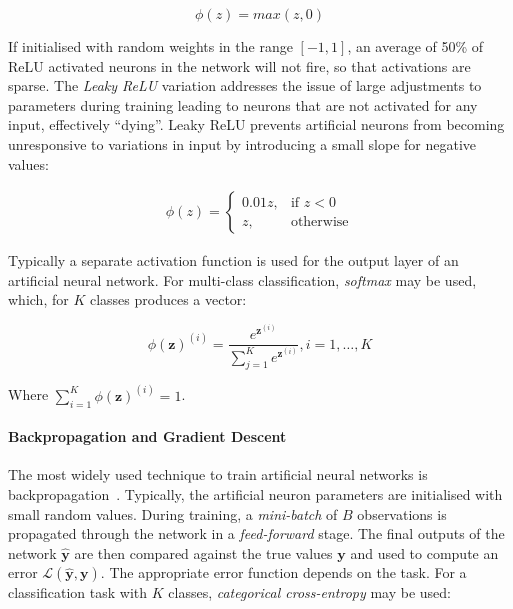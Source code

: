 \begin{equation}
  \phi(z) = max(z, 0)
\end{equation}

If initialised with random weights in the range $[-1,1]$, an average of 50\% of ReLU activated neurons in the network will not fire, so that activations are sparse.
The \emph{Leaky ReLU} variation addresses the issue of large adjustments to parameters during training leading to neurons that are not activated for any input, effectively ``dying''. Leaky ReLU prevents artificial neurons from becoming unresponsive to variations in input by introducing a small slope for negative values:

\begin{align}
  \phi(z) =
    \begin{cases}
      0.01z, & \text{if } z < 0\\
      z, & \text{otherwise}
    \end{cases}
\end{align}

Typically a separate activation function is used for the output layer of an artificial neural network. For multi-class classification, \emph{softmax} may be used, which, for $K$ classes produces a vector:

\begin{equation}
  \phi(\bm{z})^{(i)} = \frac{e^{\bm{z}^{(i)}}}{\sum_{j=1}^{K} e^{\bm{z}^{(i)}}}, i = 1, \ldots, K
\end{equation}

Where $\sum_{i=1}^{K} \phi (\bm{z})^{(i)} = 1$.


\paragraph*{Backpropagation and Gradient Descent}

The most widely used technique to train artificial neural networks is backpropagation~\cite{Rumelhart1986}. Typically, the artificial neuron parameters are initialised with small random values. During training, a \emph{mini-batch} of $B$ observations is propagated through the network in a \emph{feed-forward} stage. The final outputs of the network $\bm{\hat{y}}$ are then compared against the true values $\bm{y}$ and used to compute an error $\mathcal{L}(\bm{\hat{y}}, \bm{y})$. The appropriate error function depends on the task. For a classification task with $K$ classes, \emph{categorical cross-entropy} may be used:

